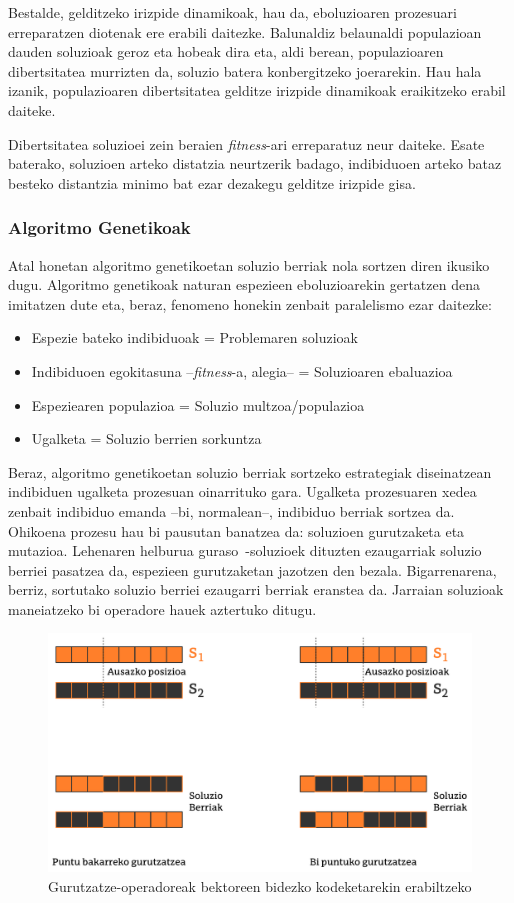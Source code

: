 \documentclass[eu]{ifirak}\usepackage[]{graphicx}\usepackage[]{color}
\newcommand{\zkk}{\guillemotleft}
\newcommand{\skk}{\guillemotright}
\newcommand{\eng}[1]{\textit{#1}}
\newcommand{\hgl}[1]{\zkk #1\skk\ }
\begin{document}
Bestalde, gelditzeko irizpide dinamikoak, hau da, eboluzioaren prozesuari erreparatzen diotenak ere erabili daitezke. Balunaldiz belaunaldi populazioan dauden soluzioak geroz eta hobeak dira eta, aldi berean, populazioaren dibertsitatea murrizten da, soluzio batera konbergitzeko joerarekin. Hau hala izanik, populazioaren dibertsitatea gelditze irizpide dinamikoak eraikitzeko erabil daiteke.

Dibertsitatea soluzioei zein beraien \eng{fitness}-ari erreparatuz neur daiteke. Esate baterako, soluzioen arteko distatzia neurtzerik badago, indibiduoen arteko bataz besteko distantzia minimo bat ezar dezakegu gelditze irizpide gisa.

\subsubsection{Algoritmo Genetikoak}

Atal honetan algoritmo genetikoetan \cite{holland1975} soluzio berriak nola sortzen diren ikusiko dugu. Algoritmo genetikoak naturan espezieen eboluzioarekin gertatzen dena imitatzen dute eta, beraz, fenomeno honekin zenbait paralelismo ezar daitezke:

\begin{itemize}
\item Espezie bateko indibiduoak = Problemaren soluzioak
\item Indibiduoen egokitasuna --\eng{fitness}-a, alegia-- = Soluzioaren ebaluazioa
\item Espeziearen populazioa = Soluzio multzoa/populazioa
\item Ugalketa = Soluzio berrien sorkuntza
\end{itemize}

Beraz, algoritmo genetikoetan soluzio berriak sortzeko estrategiak diseinatzean indibiduen ugalketa prozesuan oinarrituko gara.  Ugalketa prozesuaren xedea zenbait indibiduo emanda --bi, normalean--, indibiduo berriak sortzea da. Ohikoena prozesu hau bi pausutan banatzea da: soluzioen gurutzaketa eta mutazioa. Lehenaren helburua \hgl{guraso}-soluzioek dituzten ezaugarriak soluzio berriei pasatzea da, espezieen gurutzaketan jazotzen den bezala. Bigarrenarena, berriz, sortutako soluzio berriei ezaugarri berriak eranstea da. Jarraian soluzioak maneiatzeko bi operadore hauek aztertuko ditugu.

\begin{figure}[tb]
\centering
\includegraphics[width=0.7\linewidth]{./Irudiak/point_crossover}
\caption{Gurutzatze-operadoreak bektoreen bidezko kodeketarekin erabiltzeko}
\label{fig:point_crossover}
\end{figure}
\end{document}
